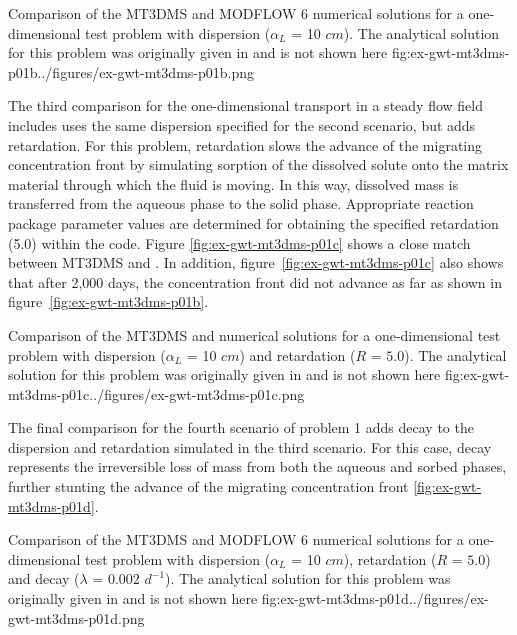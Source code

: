 \begin{StandardFigure}
	{Comparison of the MT3DMS and MODFLOW 6 numerical solutions for a one-dimensional test problem with dispersion ($\alpha_L$ = 10 $cm$).  The analytical solution for this problem was originally given in \cite{vanGenuchtenAlves1982} and is not shown here}
	{fig:ex-gwt-mt3dms-p01b}{../figures/ex-gwt-mt3dms-p01b.png}
\end{StandardFigure}

The third comparison for the one-dimensional transport in a steady flow field includes uses the same dispersion specified for the second scenario, but adds retardation.  For this problem, retardation slows the advance of the migrating concentration front by simulating sorption of the dissolved solute onto the matrix material through which the fluid is moving. In this way, dissolved mass is transferred from the aqueous phase to the solid phase. Appropriate reaction package parameter values are determined for obtaining the specified retardation (5.0) within the code. Figure \ref{fig:ex-gwt-mt3dms-p01c} shows a close match between MT3DMS and \mf. In addition, figure~\ref{fig:ex-gwt-mt3dms-p01c} also shows that after 2,000 days, the concentration front did not advance as far as shown in figure~\ref{fig:ex-gwt-mt3dms-p01b}.

\begin{StandardFigure}
	{Comparison of the MT3DMS and \mf numerical solutions for a one-dimensional test problem with dispersion ($\alpha_L$ = 10 $cm$) and retardation ($R$ = $5.0$). The analytical solution for this problem was originally given in \cite{vanGenuchtenAlves1982} and is not shown here}
	{fig:ex-gwt-mt3dms-p01c}{../figures/ex-gwt-mt3dms-p01c.png}
\end{StandardFigure}

The final comparison for the fourth scenario of problem 1 adds decay to the dispersion and retardation simulated in the third scenario. For this case, decay represents the irreversible loss of mass from both the aqueous and sorbed phases, further stunting the advance of the migrating concentration front \ref{fig:ex-gwt-mt3dms-p01d}.  

\begin{StandardFigure}
	{Comparison of the MT3DMS and MODFLOW 6 numerical solutions for a one-dimensional test problem with dispersion ($\alpha_L$ = 10 $cm$), retardation ($R$ = $5.0$) and decay ($\lambda$ = 0.002 $d^{-1}$).  The analytical solution for this problem was originally given in \cite{vanGenuchtenAlves1982} and is not shown here}
	{fig:ex-gwt-mt3dms-p01d}{../figures/ex-gwt-mt3dms-p01d.png}
\end{StandardFigure}



